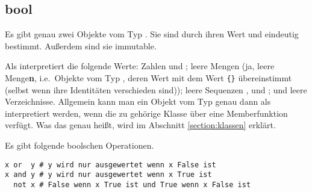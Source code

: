 \subsection{bool}
\label{section:std_data_types:bool}
Es gibt genau zwei Objekte vom Typ .
Sie sind durch ihren Wert  und  eindeutig bestimmt.
Außerdem sind sie immutable.

Als  interpretiert \Python die folgende Werte:
Zahlen  und ;
leere Mengen (ja, leere Menge{\bfseries n}, i.e.\ Objekte vom Typ , deren Wert mit dem Wert \lstinline[style=Pyinline]|{}| übereinstimmt (selbst wenn ihre Identitäten verschieden sind));
leere Sequenzen , \lpy{()} und \lpy{[]};
und leere Verzeichnisse.
Allgemein kann man ein Objekt vom Typ  genau dann als  interpretiert werden, wenn die zu  gehörige Klasse über eine Memberfunktion  verfügt.
Was das genau heißt, wird im Abschnitt \ref{section:klassen} erklärt.

Es gibt folgende boolschen Operationen.
\begin{lstlisting}
x or  y # y wird nur ausgewertet wenn x False ist
x and y # y wird nur ausgewertet wenn x True ist
  not x # False wenn x True ist und True wenn x False ist
\end{lstlisting}
